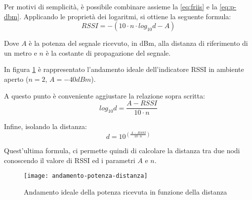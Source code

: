 Per motivi di semplicità, è possibile combinare assieme la \ref{eq:friis} e la \ref{eq:p-dbm}. Applicando le proprietà dei logaritmi, si ottiene la seguente formula:
\begin{equation}
RSSI=-(10 \cdot n \cdot log_{10}d - A)
\end{equation}

Dove $A$ è la potenza del segnale ricevuto, in dBm, alla distanza di riferimento di un metro e $n$ è la costante di propagazione del segnale.

In figura \ref{fig:andamento-potenza-distanza} è rappresentato l'andamento ideale dell'indicatore RSSI in ambiente aperto ($n=2$, $A=-40dBm$).

A questo punto è conveniente aggiustare la relazione sopra scritta:
\begin{equation}
log_{10}d = \frac{A - RSSI}{10 \cdot n}
\end{equation}

Infine, isolando la distanza:
\begin{equation}
d = 10^{(\frac{A - RSSI}{10 \cdot n})}
\end{equation}

Quest'ultima formula, ci permette quindi di calcolare la distanza tra due nodi conoscendo il valore di RSSI ed i parametri $A$ e $n$.

\begin{figure}[htp]
	\centering
	\texttt{[image: andamento-potenza-distanza]}
	\caption{Andamento ideale della potenza ricevuta in funzione della distanza}
	\label{fig:andamento-potenza-distanza}
\end{figure}

